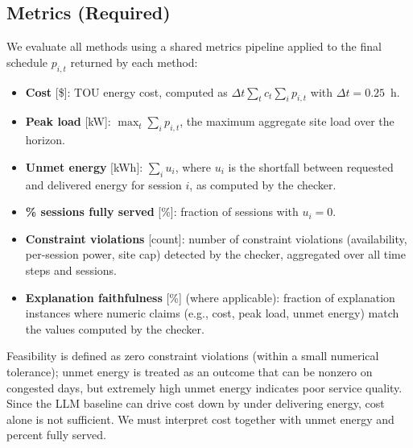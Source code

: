 \documentclass{article}
\begin{document}
\subsection{Metrics (Required)}
We evaluate all methods using a shared metrics pipeline applied to the final schedule $p_{i,t}$ returned by each method:
\begin{itemize}
  \item \textbf{Cost} [\$]: TOU energy cost, computed as $\Delta t \sum_t c_t \sum_i p_{i,t}$ with $\Delta t = 0.25$~h.
  \item \textbf{Peak load} [kW]: $\max_t \sum_i p_{i,t}$, the maximum aggregate site load over the horizon.
  \item \textbf{Unmet energy} [kWh]: $\sum_i u_i$, where $u_i$ is the shortfall between requested and delivered energy for session $i$, as computed by the checker.
  \item \textbf{\% sessions fully served} [\%]: fraction of sessions with $u_i = 0$.
  \item \textbf{Constraint violations} [count]: number of constraint violations (availability, per-session power, site cap) detected by the checker, aggregated over all time steps and sessions.
  \item \textbf{Explanation faithfulness} [\%] (where applicable): fraction of explanation instances where numeric claims (e.g., cost, peak load, unmet energy) match the values computed by the checker.
\end{itemize}
Feasibility is defined as zero constraint violations (within a small numerical tolerance); unmet energy is treated as an outcome that can be nonzero on congested days, but extremely high unmet energy indicates poor service quality. Since the LLM baseline can drive cost down by under delivering energy, cost alone is not sufficient. We must interpret cost together with unmet energy and percent fully served.
\end{document}

